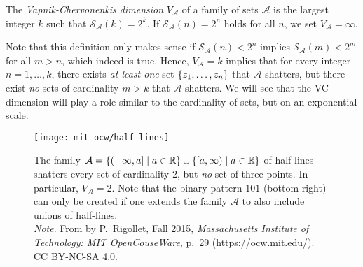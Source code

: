 \begin{definition}
The \emph{Vapnik-Chervonenkis dimension} $V_{\mathcal{A}}$ of a family of sets $\mathcal{A}$ is the largest integer $k$ such that $\mathcal{S}_{\mathcal{A}}(k) = 2^k$. If $\mathcal{S}_{\mathcal{A}}(n) = 2^n$ holds for all $n$, we set $V_{\mathcal{A}} = \infty$.
\end{definition}

Note that this definition only makes sense if $\mathcal{S}_{\mathcal{A}}(n) < 2^n$ implies $\mathcal{S}_{\mathcal{A}}(m) < 2^m$ for all $m > n$, which indeed is true. Hence, $V_{\mathcal{A}} = k$ implies that for every integer $n = 1, \dots, k$, there exists \emph{at least one} set $\set{z_1, \dots, z_n}$ that $\mathcal{A}$ shatters, but there exist \emph{no} sets of cardinality $m > k$ that $\mathcal{A}$ shatters. We will see that the VC dimension will play a role similar to the cardinality of sets, but on an exponential scale.

\begin{figure}
    \centering
    \texttt{[image: mit-ocw/half-lines]}
    \caption{%
        The family $\mathcal{A} = \set{(-\infty, a] \with a \in \R} \cup \set{[a, \infty) \with a \in \R}$ of half-lines shatters every set of cardinality $2$, but \emph{no} set of three points. In particular, $V_{\mathcal{A}} = 2$. Note that the binary pattern $101$ (bottom right) can only be created if one extends the family $\mathcal{A}$ to also include unions of half-lines. \\
        \indent\emph{Note}. From  by P.~Rigollet, Fall 2015, \emph{Massachusetts Institute of Technology: MIT OpenCouseWare}, p.~29 (\url{https://ocw.mit.edu/}). \href{https://creativecommons.org/licenses/by-nc-sa/4.0/}{CC BY-NC-SA 4.0}.
    }
    \label{fig: VC dimension of half-lines}
\end{figure}

